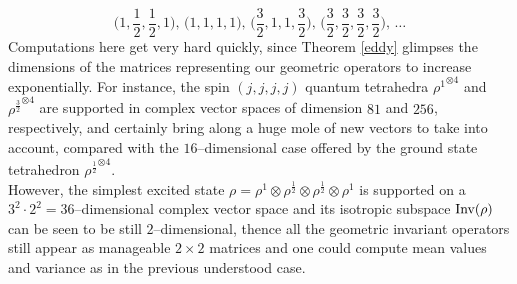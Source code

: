$$\bigg(1,\frac{1}{2},\frac{1}{2},1\bigg),\,\bigg(1,1,1,1\bigg), \,\bigg(\frac{3}{2},1,1,\frac{3}{2}\bigg),\,\bigg(\frac{3}{2}, \frac{3}{2}, \frac{3}{2}, \frac{3}{2}\bigg), \,\hdots$$
Computations here get very hard quickly, since Theorem \ref{eddy} glimpses the dimensions of the matrices representing our geometric operators to increase exponentially.
For instance, the spin $(j,j,j,j)$ quantum tetrahedra ${\rho^1}^{\otimes4}$ and ${\rho^{\frac{3}{2}}}^{\otimes4}$ are supported in complex vector spaces of dimension $81$ and $256$, respectively, and certainly bring along a huge mole of new vectors to take into account, compared with the $16$--dimensional case offered by the ground state tetrahedron ${\rho^{\frac{1}{2}}}^{\otimes4}$.\\

However, the simplest excited state $\rho=\rho^1\otimes\rho^{\frac{1}{2}}\otimes\rho^{\frac{1}{2}}\otimes\rho^1$ is supported on a $3^2\cdot2^2=36$--dimensional complex vector space and its isotropic subspace $\text{\normalfont Inv}(\rho)$ can be seen to be still $2$--dimensional, thence all the geometric invariant operators still appear as manageable $2\times2$ matrices and one could compute mean values and variance as in the previous understood case.\\

